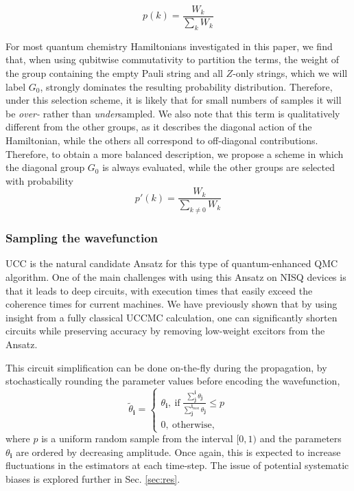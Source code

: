 \documentclass[%
 reprint,
 amsmath,amssymb,
 aps,
]{revtex4-2}
\begin{document}
{\begin{equation}
    p(k) = \frac{W_k}{\sum_k W_k}
\end{equation}

For most quantum chemistry Hamiltonians investigated in this paper, we find that, when using qubitwise commutativity to partition the terms,  the weight of the group containing the empty Pauli string and all $Z$-only strings, which we will label $G_0$, strongly dominates the resulting probability distribution. Therefore, under this selection scheme, it is likely that for small numbers of samples it will be \textit{over-} rather than \textit{under}sampled. We also note that this term is qualitatively different from the other groups, as it describes the diagonal action of the Hamiltonian, while the others all correspond to off-diagonal contributions. Therefore, to obtain a more balanced description, we propose a scheme in which the diagonal group $G_0$ is always evaluated, while the other groups are selected with probability
\begin{equation}
    p'(k) = \frac{W_k}{\sum_{k\neq 0} W_k}
\end{equation}
\subsubsection{Sampling the wavefunction}

UCC is the natural candidate Ansatz for this type of quantum-enhanced QMC algorithm. One of the main challenges with using this Ansatz on NISQ devices is that it leads to deep circuits, with execution times that easily exceed the coherence times for current machines. We have previously shown that by using insight from a fully classical UCCMC calculation,\cite{Filip2020} one can significantly shorten circuits while preserving accuracy by removing low-weight excitors from the Ansatz.\cite{Filip2022}

This circuit simplification can be done on-the-fly during the propagation, by stochastically rounding the parameter values before encoding the wavefunction,
\begin{equation}
    \widetilde \theta_\mathbf{i} = \begin{cases}
    \theta_\mathbf{i},\ \mathrm{if}\ \frac{\sum_\mathbf{j}^\mathbf{i}\theta_\mathbf{j}}{\sum_\mathbf{j}^{\mathbf{i}_\mathrm{max}}\theta_\mathbf{j}} \leq p\\
    0,\ \mathrm{otherwise},
    \end{cases}
\end{equation}
where $p$ is a uniform random sample from the interval $[0,1)$ and the parameters $\theta_\mathbf{i}$ are ordered by decreasing amplitude. Once again, this is expected to increase fluctuations in the estimators at each time-step. The issue of potential systematic biases is explored further in Sec. \ref{sec:res}.

}
\end{document}
